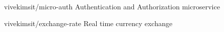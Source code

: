 

\begin{cventries}

  \cventry
    {vivekimsit/micro-auth} %
    {Authentication and Authorization microservice} %
    {} %
    {} %
    {}

  \cventry
    {vivekimsit/exchange-rate} %
    {Real time currency exchange} %
    {} %
    {} %
    {}

\end{cventries}

